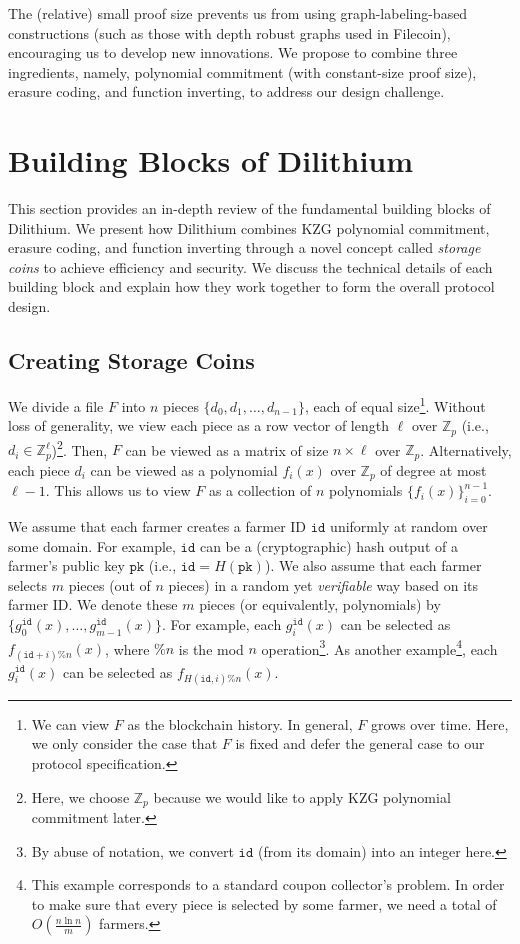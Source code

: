 \documentclass[12pt,draftcls,onecolumn]{IEEEtran}
\newcommand{\Fp}{\mathbb{Z}_p}
\newcommand{\pk}{\texttt{pk}}
\newcommand{\id}{\texttt{id}}
\begin{document}
The (relative) small proof size prevents us from using graph-labeling-based constructions (such as those with depth robust graphs used in Filecoin), encouraging us to develop new innovations. We propose to combine three ingredients, namely, polynomial commitment (with constant-size proof size), erasure coding, and function inverting, to address our design challenge. 

\section{Building Blocks of Dilithium}

This section provides an in-depth review of the fundamental building blocks of Dilithium.
We present how Dilithium combines KZG polynomial commitment, erasure coding, and function inverting through a novel concept called \emph{storage coins} to achieve efficiency and security. We discuss the technical details of each building block and explain how they work together to form the overall protocol design. 

\subsection{Creating Storage Coins}

We divide a file $F$ into $n$ pieces $\{ d_0, d_1, \ldots, d_{n-1}\}$, each of equal size\footnote{We can view $F$ as the blockchain history. In general, $F$ grows over time. Here, we only consider the case that $F$ is fixed and defer the general case to our protocol specification.}. 
Without loss of generality, we view each piece as a row vector of length $\ell$ over $\Fp$  (i.e., $d_i \in \Fp^\ell$)\footnote{Here, we choose $\Fp$ because we would like to apply KZG polynomial commitment later.}.
Then, $F$ can be viewed as a matrix of size $n \times \ell$ over $\Fp$.
Alternatively, each piece $d_i$ can be viewed as a polynomial $f_i(x)$ over $\Fp$ of degree at most $\ell - 1$. 
This allows us to view $F$ as a collection of $n$ polynomials $\{ f_i(x) \}_{i = 0}^{n-1}$. 

We assume that each farmer creates a farmer ID $\id$ uniformly at random over some domain. For example, $\id$ can be a (cryptographic) hash output of a farmer's public key $\pk$ (i.e., $\id = H(\pk)$).
We also assume that each farmer selects $m$ pieces (out of $n$ pieces) in a random yet \emph{verifiable} way based on its farmer ID.
We denote these $m$ pieces (or equivalently, polynomials) by $\{g_0^{\id}(x), \ldots, g_{m-1}^{\id}(x) \}$.
For example, each $g_i^{\id}(x)$ can be selected as $f_{(\id + i)\% n}(x)$, where $\% n$ is the mod $n$ operation\footnote{By abuse of notation, we convert $\id$ (from its domain) into an integer here.}.
As another example\footnote{This example corresponds to a standard coupon collector's problem. In order to make sure that every piece is selected by some farmer, we need a total of $O\left( \frac{n \ln n}{m} \right)$ farmers.}, each $g_i^{\id}(x)$ can be selected as $f_{H(\id, i)\% n}(x)$.
\end{document}
